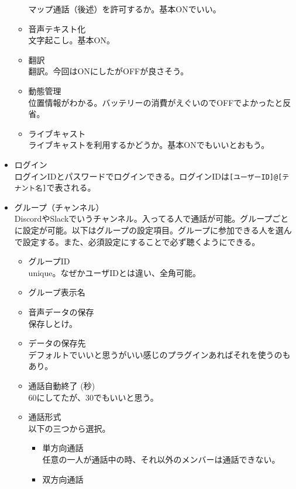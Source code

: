 \documentclass[a4paper]{ltjsreport}
\newcommand{\terlogy}[2][|]{\colorbox{terlogy}{\texttt{\lstinline#1#2#1}}}
\begin{document}
\begin{itemize}
\begin{itemize}
                マップ通話（後述）を許可するか。基本ONでいい。
          \item 音声テキスト化\\
                文字起こし。基本ON。
          \item 翻訳\\
                翻訳。今回はONにしたがOFFが良さそう。
          \item 動態管理\\
                位置情報がわかる。バッテリーの消費がえぐいのでOFFでよかったと反省。
          \item ライブキャスト\\
                ライブキャストを利用するかどうか。基本ONでもいいとおもう。
        \end{itemize}
  \item ログイン\\
        ログインIDとパスワードでログインできる。ログインIDは\terlogy{[ユーザーID]@[テナント名]}で表される。
  \item グループ（チャンネル）\\
        DiscordやSlackでいうチャンネル。入ってる人で通話が可能。グループごとに設定が可能。以下はグループの設定項目。グループに参加できる人を選んで設定する。また、必須設定にすることで必ず聴くようにできる。
        \begin{itemize}
          \item グループID\\
                unique。なぜかユーザIDとは違い、全角可能。
          \item グループ表示名
          \item 音声データの保存\\
                保存しとけ。
          \item データの保存先\\
                デフォルトでいいと思うがいい感じのプラグインあればそれを使うのもあり。
          \item 通話自動終了 (秒)\\
                60にしてたが、30でもいいと思う。
          \item 通話形式\\
                以下の三つから選択。
                \begin{itemize}
                  \item 単方向通話\\
                        任意の一人が通話中の時、それ以外のメンバーは通話できない。
                  \item 双方向通話\\

\end{itemize}
\end{itemize}
\end{itemize}
\end{document}
